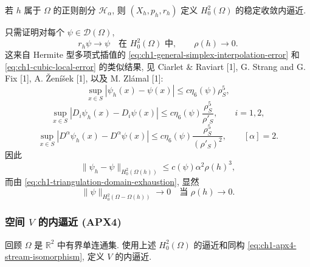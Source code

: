 \begin{Proposition}
\label{prop:ch1-apx4-h02-stable-convergent}
若 $h$ 属于 $\Omega$ 的正则剖分 $\mathcal H_\alpha$, 则 $(X_h,p_h,r_h)$ 定义 $H_0^2(\Omega)$ 的稳定收敛内逼近.
\end{Proposition}

\begin{Proof}
只需证明对每个 $\psi\in\mathcal D(\Omega)$,
\begin{equation}
r_h\psi\longrightarrow\psi
\quad\text{在 }H_0^2(\Omega)\text{ 中},
\qquad \rho(h)\longrightarrow0.
\label{eq:ch1-apx4-h02-convergence}
\end{equation}
这来自 Hermite 型多项式插值的 \eqref{eq:ch1-general-simplex-interpolation-error} 和 \eqref{eq:ch1-cubic-local-error} 的类似结果, 见 Ciarlet \& Raviart [1], G. Strang and G. Fix [1], A. Ženíšek [1], 以及 M. Zlámal [1]:
\begin{equation}
\sup_{x\in S}|\psi_h(x)-\psi(x)|
\leq c\eta_6(\psi)\rho_S^5,
\label{eq:ch1-apx4-error-order-zero}
\end{equation}
\begin{equation}
\sup_{x\in S}|D_i\psi_h(x)-D_i\psi(x)|
\leq c\eta_6(\psi)\frac{\rho_S^5}{\rho'_S},
\qquad i=1,2,
\label{eq:ch1-apx4-error-order-one}
\end{equation}
\begin{equation}
\sup_{x\in S}|D^\alpha\psi_h(x)-D^\alpha\psi(x)|
\leq c\eta_6(\psi)\frac{\rho_S^5}{(\rho'_S)^2},
\qquad [\alpha]=2.
\label{eq:ch1-apx4-error-order-two}
\end{equation}
因此
\begin{equation}
\|\psi_h-\psi\|_{H_0^2(\Omega(h))}
\leq c(\psi)\alpha^2\rho(h)^3,
\label{eq:ch1-apx4-h02-domain-error}
\end{equation}
而由 \eqref{eq:ch1-triangulation-domain-exhaustion}, 显然
\begin{equation}
\|\psi\|_{H_0^2(\Omega-\Omega(h))}\longrightarrow0
\quad\text{当 }\rho(h)\longrightarrow0.
\label{eq:ch1-apx4-h02-outside-error}
\end{equation}
\end{Proof}

\subsubsection*{空间 $V$ 的内逼近 (APX4)}

回顾 $\Omega$ 是 $\mathbb R^2$ 中有界单连通集. 使用上述 $H_0^2(\Omega)$ 的逼近和同构 \eqref{eq:ch1-apx4-stream-isomorphism}, 定义 $V$ 的内逼近.


